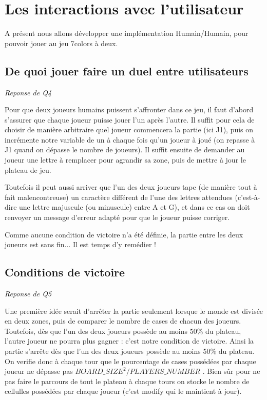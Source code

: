 \documentclass[a4paper,11pt]{article}
\begin{document}


\section{Les interactions avec l'utilisateur}

A présent nous allons développer une implémentation Humain/Humain, pour 
pouvoir jouer au jeu 7colors à deux.

\subsection{De quoi jouer faire un duel entre utilisateurs}
\emph{Reponse de Q4}

Pour que deux joueurs humains puissent s'affronter dans ce jeu, il faut d'abord s'assurer que chaque joueur puisse jouer l'un après l'autre. Il suffit pour cela  de choisir de manière arbitraire quel joueur commencera la partie (ici J1), puis on incrémente notre variable de un à chaque fois qu'un joueur à joué (on repasse à J1 quand on dépasse le nombre de joueurs). Il suffit ensuite de demander au joueur une lettre à remplacer pour agrandir sa zone, puis de mettre à jour le plateau de jeu.

Toutefois il peut aussi arriver que l'un des deux joueurs tape (de manière tout à fait malencontreuse) un caractère différent de l'une des lettres attendues  (c'est-à-dire une lettre majuscule (ou minuscule) entre A et G), et dans ce cas on doit renvoyer un message d'erreur adapté pour que le joueur puisse corriger.

Comme aucune condition de victoire n'a été définie, la partie entre les deux joueurs est sans fin... Il est temps d'y remédier !  


\subsection{Conditions de victoire}
\emph{Reponse de Q5}

Une première idée serait d'arrêter la partie seulement lorsque le monde est
divisée en deux zones, puis de comparer le nombre de cases de chacun des joueurs.
Toutefois, dès que l'un des deux joueurs possède au moins 50\% du plateau, l'autre joueur
ne pourra plus gagner : c'est notre condition de victoire. 
Ainsi la partie s'arrête dès que l'un des deux joueurs possède au moins 50\% du plateau.
On verifie donc à chaque tour que le pourcentage de cases possédées par chaque joueur ne dépasse pas $BOARD\_SIZE^2/PLAYERS\_NUMBER$ . Bien sûr pour ne pas faire le parcours de tout le plateau à chaque tours on stocke le nombre de cellulles possédées par chaque joueur (c'est modify qui le maintient à jour).
\end{document}
